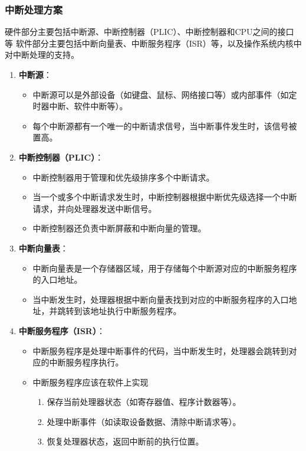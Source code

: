 \documentclass[12pt,hyperref,a4paper,UTF8]{ctexart}
\begin{document}
\subsubsection*{中断处理方案}
\normalsize

硬件部分主要包括中断源、中断控制器（PLIC）、中断控制器和CPU之间的接口等
软件部分主要包括中断向量表、中断服务程序（ISR）等，以及操作系统内核中对中断处理的支持。
\begin{enumerate}
    \item \textbf{中断源}：
    \begin{itemize}
        \item 中断源可以是外部设备（如键盘、鼠标、网络接口等）或内部事件（如定时器中断、软件中断等）。
        \item 每个中断源都有一个唯一的中断请求信号，当中断事件发生时，该信号被置高。
    \end{itemize}

    \item \textbf{中断控制器（PLIC）}：
    \begin{itemize}
        \item 中断控制器用于管理和优先级排序多个中断请求。
        \item 当一个或多个中断请求发生时，中断控制器根据中断优先级选择一个中断请求，并向处理器发送中断信号。
        \item 中断控制器还负责中断屏蔽和中断向量的管理。
    \end{itemize}

    \item \textbf{中断向量表}：
    \begin{itemize}
        \item 中断向量表是一个存储器区域，用于存储每个中断源对应的中断服务程序的入口地址。
        \item 当中断发生时，处理器根据中断向量表找到对应的中断服务程序的入口地址，并跳转到该地址执行中断服务程序。
    \end{itemize}

    \item \textbf{中断服务程序（ISR）}：
    \begin{itemize}
        \item 中断服务程序是处理中断事件的代码，当中断发生时，处理器会跳转到对应的中断服务程序执行。
        \item 中断服务程序应该在软件上实现
        \begin{enumerate}
            \item 保存当前处理器状态（如寄存器值、程序计数器等）。
            \item 处理中断事件（如读取设备数据、清除中断请求等）。
            \item 恢复处理器状态，返回中断前的执行位置。
        \end{enumerate}
    \end{itemize}


\end{enumerate}
\end{document}
